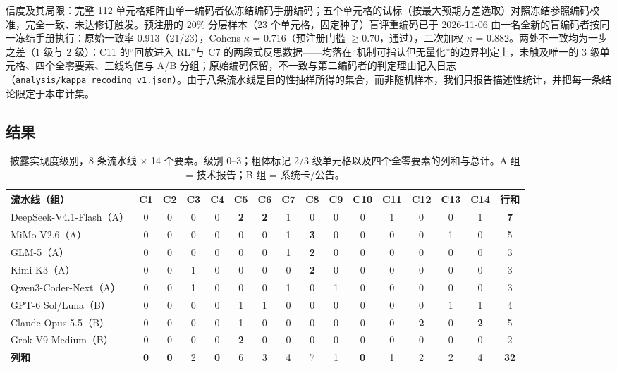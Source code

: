 \documentclass[10pt,fontset=fandol]{ctexart}
\begin{document}
信度及其局限：完整 112 单元格矩阵由单一编码者依冻结编码手册编码；五个单元格的试标（按最大预期方差选取）对照冻结参照编码校准，完全一致、未达修订触发。预注册的 20\% 分层样本（23 个单元格，固定种子）盲评重编码已于 2026-11-06 由一名全新的盲编码者按同一冻结手册执行：原始一致率 0.913（21/23），Cohen\textquotesingle{}s $\kappa$ = 0.716（预注册门槛 $\ge 0.70$，通过），二次加权 $\kappa$ = 0.882。两处不一致均为一步之差（1 级与 2 级）：C11 的“回放进入 RL”与 C7 的两段式反思数据——均落在“机制可指认但无量化”的边界判定上，未触及唯一的 3 级单元格、四个全零要素、三线均值与 A/B 分组；原始编码保留，不一致与第二编码者的判定理由记入日志（\texttt{analysis/kappa\_recoding\_v1.json}）。由于八条流水线是目的性抽样所得的集合，而非随机样本，我们只报告描述性统计，并把每一条结论限定于本审计集。



\subsection{结果}

\begin{table}
\centering
\caption{披露实现度级别，8 条流水线 $\times$ 14 个要素。级别 0--3；粗体标记 2/3 级单元格以及四个全零要素的列和与总计。A 组 = 技术报告；B 组 = 系统卡/公告。}
\label{tab:matrix}
\small
\begin{tabular}{l c c c c c c c c c c c c c c c}
\toprule
流水线（组） & C1 & C2 & C3 & C4 & C5 & C6 & C7 & C8 & C9 & C10 & C11 & C12 & C13 & C14 & 行和 \\
\midrule
DeepSeek-V4.1-Flash（A） & 0 & 0 & 0 & 0 & \textbf{2} & \textbf{2} & 1 & 0 & 0 & 0 & 1 & 0 & 0 & 1 & \textbf{7} \\
MiMo-V2.6（A）          & 0 & 0 & 0 & 0 & 0 & 0 & 1 & \textbf{3} & 0 & 0 & 0 & 0 & 1 & 0 & 5 \\
GLM-5（A）              & 0 & 0 & 0 & 0 & 0 & 0 & 1 & \textbf{2} & 0 & 0 & 0 & 0 & 0 & 0 & 3 \\
Kimi K3（A）            & 0 & 0 & 1 & 0 & 0 & 0 & 0 & \textbf{2} & 0 & 0 & 0 & 0 & 0 & 0 & 3 \\
Qwen3-Coder-Next（A）   & 0 & 0 & 1 & 0 & 0 & 0 & 1 & 0 & 1 & 0 & 0 & 0 & 0 & 0 & 3 \\
GPT-6 Sol/Luna（B）     & 0 & 0 & 0 & 0 & 1 & 1 & 0 & 0 & 0 & 0 & 0 & 0 & 1 & 1 & 4 \\
Claude Opus 5.5（B）    & 0 & 0 & 0 & 0 & 1 & 0 & 0 & 0 & 0 & 0 & 0 & \textbf{2} & 0 & \textbf{2} & 5 \\
Grok V9-Medium（B）     & 0 & 0 & 0 & 0 & \textbf{2} & 0 & 0 & 0 & 0 & 0 & 0 & 0 & 0 & 0 & 2 \\
\midrule
\textbf{列和} & \textbf{0} & \textbf{0} & 2 & \textbf{0} & 6 & 3 & 4 & 7 & 1 & \textbf{0} & 1 & 2 & 2 & 4 & \textbf{32} \\
\bottomrule
\end{tabular}
\end{table}
\end{document}
